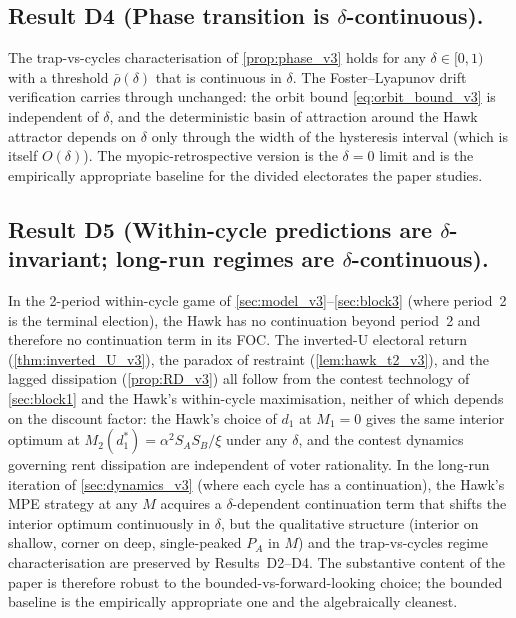 \documentclass[11pt,twoside]{extarticle}
\begin{document}
\subsection*{Result D4 (Phase transition is $\delta$-continuous).} The trap-vs-cycles characterisation of \autoref{prop:phase_v3} holds for any $\delta\in[0,1)$ with a threshold $\bar\rho(\delta)$ that is continuous in $\delta$. The Foster--Lyapunov drift verification carries through unchanged: the orbit bound \autoref{eq:orbit_bound_v3} is independent of $\delta$, and the deterministic basin of attraction around the Hawk attractor depends on $\delta$ only through the width of the hysteresis interval (which is itself $O(\delta)$). The myopic-retrospective version is the $\delta=0$ limit and is the empirically appropriate baseline for the divided electorates the paper studies.

\subsection*{Result D5 (Within-cycle predictions are $\delta$-invariant; long-run regimes are $\delta$-continuous).} In the 2-period within-cycle game of \autoref{sec:model_v3}--\autoref{sec:block3} (where period~2 is the terminal election), the Hawk has no continuation beyond period~2 and therefore no continuation term in its FOC. The inverted-U electoral return (\autoref{thm:inverted_U_v3}), the paradox of restraint (\autoref{lem:hawk_t2_v3}), and the lagged dissipation (\autoref{prop:RD_v3}) all follow from the contest technology of \autoref{sec:block1} and the Hawk's within-cycle maximisation, neither of which depends on the discount factor: the Hawk's choice of $d_1$ at $M_1=0$ gives the same interior optimum at $M_2(d_1^*)=\alpha^2 S_A S_B/\xi$ under any $\delta$, and the contest dynamics governing rent dissipation are independent of voter rationality. In the long-run iteration of \autoref{sec:dynamics_v3} (where each cycle has a continuation), the Hawk's MPE strategy at any $M$ acquires a $\delta$-dependent continuation term that shifts the interior optimum continuously in $\delta$, but the qualitative structure (interior on shallow, corner on deep, single-peaked $P_A$ in $M$) and the trap-vs-cycles regime characterisation are preserved by Results~D2--D4. The substantive content of the paper is therefore robust to the bounded-vs-forward-looking choice; the bounded baseline is the empirically appropriate one and the algebraically cleanest.

\end{document}
